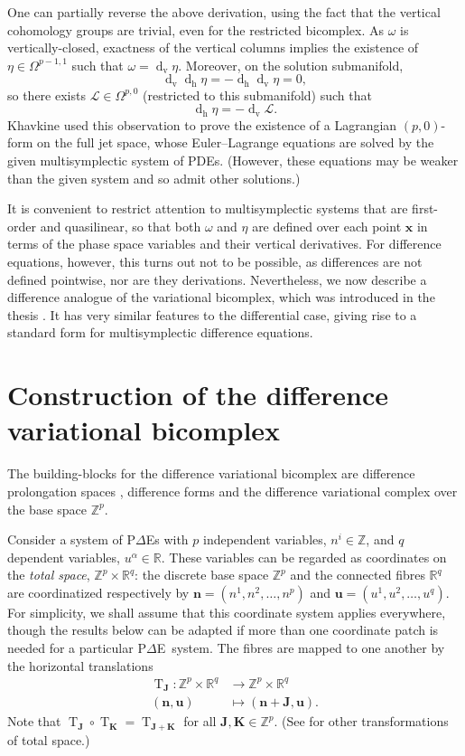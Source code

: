\documentclass[11pt]{article} %
\numberwithin{equation}{section}
\newcommand{\te}{\operatorname{T}}
\newcommand{\teJ}{\te_\mathbf{J}}
\newcommand{\teK}{\te_\mathbf{K}}
\newcommand{\upd}{\operatorname{d}}
\newcommand{\uph}{\operatorname{h}}
\newcommand{\upv}{\operatorname{v}}
\newcommand{\dv}{\upd_{\upv}\!}
\newcommand{\pde}{P$\Delta$E}
\newcommand{\mbn}{\mathbf{n}}
\newcommand{\mbu}{\mathbf{u}}
\newcommand{\mbx}{\mathbf{x}}
\newcommand{\mbJ}{\mathbf{J}}
\newcommand{\mbK}{\mathbf{K}}
\newcommand{\msL}{\mathscr{L}}
\theoremstyle{plain}
\theoremstyle{definition}
\begin{document}
One can partially reverse the above derivation, using the fact that the vertical cohomology groups are trivial, even for the restricted bicomplex. As $\omega$ is vertically-closed, exactness of the vertical columns implies the existence of $\eta\in\Omega^{p-1,1}$ such that $\omega = \dv \eta$. Moreover, on the solution submanifold,
\[
\dv \upd_{\uph}\!\eta=-\upd_{\uph}\!\dv \eta=0,
\]
so there exists $\msL\in\Omega^{p,0}$ (restricted to this submanifold) such that
\[
\upd_{\uph}\!\eta=-\dv \msL.
\]
Khavkine \cite{Khavkine} used this observation to prove the existence of a Lagrangian $(p,0)$-form on the full jet space, whose Euler--Lagrange equations are solved by the given multisymplectic system of PDEs. (However, these equations may be weaker than the given system and so admit other solutions.)

It is convenient to restrict attention to multisymplectic systems that are first-order and quasilinear, so that both $\omega$ and $\eta$ are defined over each point $\mbx$ in terms of the phase space variables and their vertical derivatives. For difference equations, however, this turns out not to be possible, as differences are not defined pointwise, nor are they derivations. Nevertheless, we now describe a difference analogue of the variational bicomplex, which was introduced in the thesis \cite{Pe2013}. It has very similar features to the differential case, giving rise to a standard form for multisymplectic difference equations.



\section{Construction of the difference variational bicomplex}\label{sec:dvb}
The building-blocks for the difference variational bicomplex are difference prolongation spaces \cite{MaRoHyPe2019}, difference forms \cite{HyMa2004,MaHy2008} and the difference variational complex \cite{HyMa2004} over the base space $\mathbb{Z}^p$.

Consider a system of P$\Delta$Es with $p$ independent variables, $n^i\in\mathbb{Z}$, and $q$ dependent variables, $u^\alpha\in\mathbb{R}$. These variables can be regarded as coordinates on the \textit{total space}, $\mathbb{Z}^p\times\mathbb{R}^q$: the discrete base space $\mathbb{Z}^p$ and the connected fibres $\mathbb{R}^q$ are coordinatized respectively by $\mbn=(n^1,n^2,\ldots,n^p)$ and $\mbu=(u^1,u^2,\dots,u^q)$. For simplicity, we shall assume that this coordinate system applies everywhere, though the results below can be adapted if more than one coordinate patch is needed for a particular \pde\ system.
The fibres are mapped to one another by the horizontal translations
\begin{equation}
\begin{aligned}
\teJ:\mathbb{Z}^p\times\mathbb{R}^q&\rightarrow\mathbb{Z}^p\times\mathbb{R}^q\\
(\mbn,\mbu)&\mapsto(\mbn+\mbJ,\mbu).
\end{aligned}
\end{equation}
Note that $\teJ\circ\teK=\te_{\mbJ+\mbK}$ for all $\mbJ,\mbK\in\mathbb{Z}^p$. (See \cite{Hy2014} for other transformations of total space.)
\end{document}
